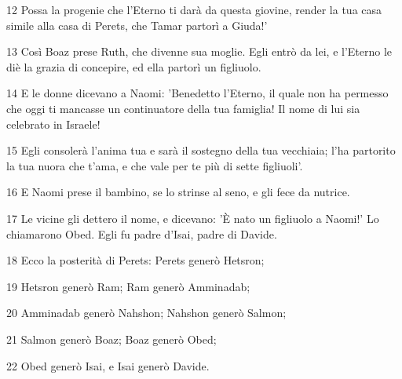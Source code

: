 \par 12 Possa la progenie che l'Eterno ti darà da questa giovine, render la tua casa simile alla casa di Perets, che Tamar partorì a Giuda!'
\par 13 Così Boaz prese Ruth, che divenne sua moglie. Egli entrò da lei, e l'Eterno le diè la grazia di concepire, ed ella partorì un figliuolo.
\par 14 E le donne dicevano a Naomi: 'Benedetto l'Eterno, il quale non ha permesso che oggi ti mancasse un continuatore della tua famiglia! Il nome di lui sia celebrato in Israele!
\par 15 Egli consolerà l'anima tua e sarà il sostegno della tua vecchiaia; l'ha partorito la tua nuora che t'ama, e che vale per te più di sette figliuoli'.
\par 16 E Naomi prese il bambino, se lo strinse al seno, e gli fece da nutrice.
\par 17 Le vicine gli dettero il nome, e dicevano: 'È nato un figliuolo a Naomi!' Lo chiamarono Obed. Egli fu padre d'Isai, padre di Davide.
\par 18 Ecco la posterità di Perets: Perets generò Hetsron;
\par 19 Hetsron generò Ram; Ram generò Amminadab;
\par 20 Amminadab generò Nahshon; Nahshon generò Salmon;
\par 21 Salmon generò Boaz; Boaz generò Obed;
\par 22 Obed generò Isai, e Isai generò Davide.


